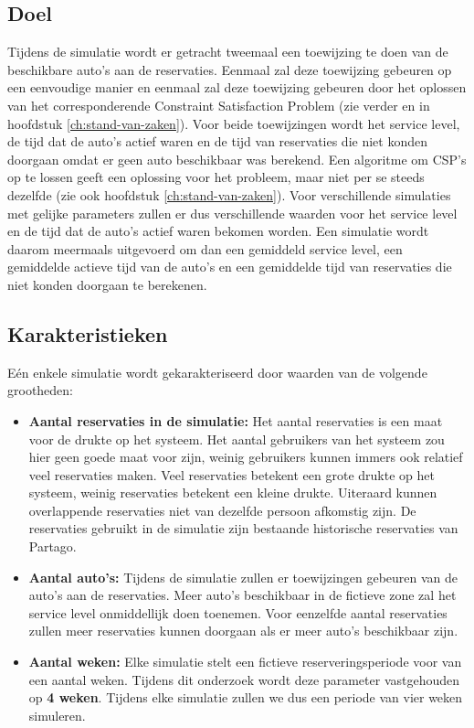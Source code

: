 \subsection{Doel}
Tijdens de simulatie wordt er getracht tweemaal een toewijzing te doen van de beschikbare auto's aan de reservaties. Eenmaal zal deze toewijzing gebeuren op een eenvoudige manier en eenmaal zal deze toewijzing gebeuren door het oplossen van het corresponderende Constraint Satisfaction Problem (zie verder en in hoofdstuk \ref{ch:stand-van-zaken}). Voor beide toewijzingen wordt het service level, de tijd dat de auto's actief waren en de tijd van reservaties die niet konden doorgaan omdat er geen auto beschikbaar was berekend. Een algoritme om CSP's op te lossen geeft een oplossing voor het probleem, maar niet per se steeds dezelfde (zie ook hoofdstuk \ref{ch:stand-van-zaken}). Voor verschillende simulaties met gelijke parameters zullen er dus verschillende waarden voor het service level en de tijd dat de auto's actief waren bekomen worden. Een simulatie wordt daarom meermaals uitgevoerd om dan een gemiddeld service level, een gemiddelde actieve tijd van de auto's en een gemiddelde tijd van reservaties die niet konden doorgaan te berekenen.

\subsection{Karakteristieken}
Eén enkele simulatie wordt gekarakteriseerd door waarden van de volgende grootheden:
\begin{itemize}
	\item \textbf{Aantal reservaties in de simulatie:}
	Het aantal reservaties is een maat voor de drukte op het systeem. Het aantal gebruikers van het systeem zou hier geen goede maat voor zijn, weinig gebruikers kunnen immers ook relatief veel reservaties maken. Veel reservaties betekent een grote drukte op het systeem, weinig reservaties betekent een kleine drukte. Uiteraard kunnen overlappende reservaties niet van dezelfde persoon afkomstig zijn. De reservaties gebruikt in de simulatie zijn bestaande historische reservaties van Partago.
	\item \textbf{Aantal auto's:}
	Tijdens de simulatie zullen er toewijzingen gebeuren van de auto's aan de reservaties. Meer auto's beschikbaar in de fictieve zone zal het service level onmiddellijk doen toenemen. Voor eenzelfde aantal reservaties zullen meer reservaties kunnen doorgaan als er meer auto's beschikbaar zijn. 
	\item \textbf{Aantal weken:}
	Elke simulatie stelt een fictieve reserveringsperiode voor van een aantal weken. Tijdens dit onderzoek wordt deze parameter vastgehouden op \textbf{4 weken}. Tijdens elke simulatie zullen we dus een periode van vier weken simuleren. 
\end{itemize} 

